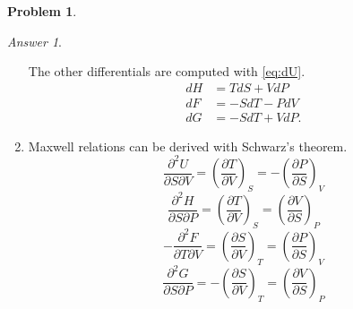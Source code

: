 \documentclass[a4paper, 12pt]{article}
\theoremstyle{definition}
\newtheorem{problem}{Problem}[section]
\theoremstyle{remark}
\newtheorem*{answer}{Answer}
\begin{document}
\begin{problem}
\begin{answer}
\begin{enumerate}
                The other differentials are computed with \eqref{eq:dU}.
                \begin{align*}
                    dH &= TdS + VdP \\
                    dF &= -SdT - PdV \\
                    dG &= -SdT + VdP.
                \end{align*}

            \item Maxwell relations can be derived with Schwarz's theorem.
                \[
                    \frac{\partial^2 U}{\partial S \partial V}
                    = \left( \frac{\partial T}{\partial V} \right)_S
                    = -\left( \frac{\partial P}{\partial S} \right)_V
                \]
                \[
                    \frac{\partial^2 H}{\partial S \partial P}
                    = \left( \frac{\partial T}{\partial V} \right)_S
                    = \left( \frac{\partial V}{\partial S} \right)_P
                \]
                \[
                    -\frac{\partial^2 F}{\partial T \partial V}
                    = \left( \frac{\partial S}{\partial V} \right)_T
                    = \left( \frac{\partial P}{\partial S} \right)_V
                \]
                \[
                    \frac{\partial^2 G}{\partial S \partial P}
                    = -\left( \frac{\partial S}{\partial V} \right)_T
                    = \left( \frac{\partial V}{\partial S} \right)_P
                \]
        \end{enumerate}
    \end{answer}
\end{problem}
\end{document}
